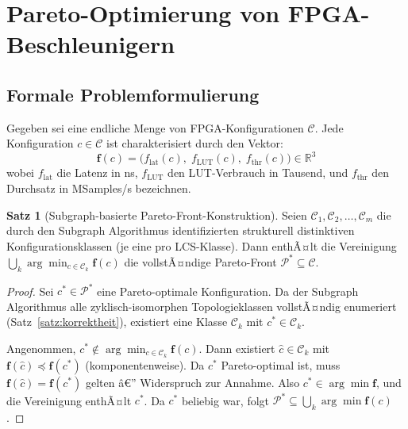 ﻿\documentclass[a4paper,12pt]{article}
\theoremstyle{definition}
\newtheorem{satz}{Satz}
\begin{document}
\section{Pareto-Optimierung von FPGA-Beschleunigern}
\label{sec:pareto}

\subsection{Formale Problemformulierung}

Gegeben sei eine endliche Menge von FPGA-Konfigurationen $\mathcal{C}$. Jede Konfiguration
$c \in \mathcal{C}$ ist charakterisiert durch den Vektor:
\[
    \mathbf{f}(c) = \bigl(f_{\text{lat}}(c),\; f_{\text{LUT}}(c),\; f_{\text{thr}}(c)\bigr) \in \mathbb{R}^3
\]
wobei $f_{\text{lat}}$ die Latenz in ns, $f_{\text{LUT}}$ den LUT-Verbrauch in Tausend,
und $f_{\text{thr}}$ den Durchsatz in MSamples/s bezeichnen.

\begin{satz}[Subgraph-basierte Pareto-Front-Konstruktion]
\label{satz:pareto}
    Seien $\mathcal{C}_1, \mathcal{C}_2, \ldots, \mathcal{C}_m$ die durch den Subgraph Algorithmus
    identifizierten strukturell distinktiven Konfigurationsklassen (je eine pro LCS-Klasse).
    Dann enthÃ¤lt die Vereinigung $\bigcup_k \arg\min_{c \in \mathcal{C}_k} \mathbf{f}(c)$
    die vollstÃ¤ndige Pareto-Front $\mathcal{P}^* \subseteq \mathcal{C}$.
\end{satz}

\begin{proof}
    Sei $c^* \in \mathcal{P}^*$ eine Pareto-optimale Konfiguration. Da der Subgraph Algorithmus
    alle zyklisch-isomorphen Topologieklassen vollstÃ¤ndig enumeriert (Satz~\ref{satz:korrektheit}),
    existiert eine Klasse $\mathcal{C}_k$ mit $c^* \in \mathcal{C}_k$.
    
    Angenommen, $c^* \notin \arg\min_{c \in \mathcal{C}_k} \mathbf{f}(c)$.
    Dann existiert $\hat{c} \in \mathcal{C}_k$ mit $\mathbf{f}(\hat{c}) \preceq \mathbf{f}(c^*)$
    (komponentenweise). Da $c^*$ Pareto-optimal ist, muss $\mathbf{f}(\hat{c}) = \mathbf{f}(c^*)$
    gelten â€” Widerspruch zur Annahme. Also $c^* \in \arg\min \mathbf{f}$, und die Vereinigung
    enthÃ¤lt $c^*$. Da $c^*$ beliebig war, folgt $\mathcal{P}^* \subseteq \bigcup_k \arg\min \mathbf{f}(c)$.
\end{proof}
\end{document}
